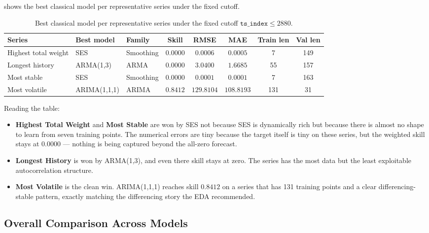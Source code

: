 shows the best classical model per representative series under the fixed cutoff.

\begin{table}[h]
\centering
\caption{Best classical model per representative series under the fixed cutoff $\mathtt{ts\_index} \le 2880$.}
\label{tab:classical_leaderboard_fixed}
\begin{tabular}{l l l c c c c c}
\toprule
Series & Best model & Family & Skill & RMSE & MAE & Train len & Val len \\
\midrule
Highest total weight & SES         & Smoothing & $0.0000$ & $0.0006$  & $0.0005$  & 7   & 149 \\
Longest history      & ARMA(1,3)   & ARMA      & $0.0000$ & $3.0400$  & $1.6685$  & 55  & 157 \\
Most stable          & SES         & Smoothing & $0.0000$ & $0.0001$  & $0.0001$  & 7   & 163 \\
Most volatile        & ARIMA(1,1,1) & ARIMA    & $\mathbf{0.8412}$ & $129.8104$ & $108.8193$ & 131 & 31 \\
\bottomrule
\end{tabular}
\end{table}

Reading the table:
\begin{itemize}
  \item \textbf{Highest Total Weight} and \textbf{Most Stable} are won by SES not because SES is dynamically rich but because there is almost no shape to learn from seven training points. The numerical errors are tiny because the target itself is tiny on these series, but the weighted skill stays at $0.0000$ --- nothing is being captured beyond the all-zero forecast.
  \item \textbf{Longest History} is won by ARMA(1,3), and even there skill stays at zero. The series has the most data but the least exploitable autocorrelation structure.
  \item \textbf{Most Volatile} is the clean win. ARIMA(1,1,1) reaches skill $0.8412$ on a series that has 131 training points and a clear differencing-stable pattern, exactly matching the differencing story the EDA recommended.
\end{itemize}

\subsection{Overall Comparison Across Models}
\label{sec:classical:overall}

